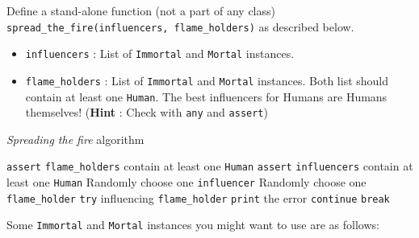 \documentclass[a4paper]{article}
\begin{document}
Define a stand-alone function (not a part of any class) \texttt{spread\_the\_fire(influencers, flame\_holders)} as described below.

\begin{itemize}
    \item \texttt{influencers} : List of \texttt{Immortal} and \texttt{Mortal} instances.
    \item \texttt{flame\_holders} : List of \texttt{Immortal} and \texttt{Mortal} instances. 
    Both list should contain at least one \texttt{Human}. The best influencers for Humans are Humans themselves! (\textbf{Hint} : Check with \texttt{any} and \texttt{assert})
\end{itemize}

\begin{algorithm}
    \caption{\textit{Spreading the fire} algorithm}
    \begin{algorithmic}[1]
            \State \texttt{assert} \texttt{flame\_holders} contain at least one \texttt{Human}
            \State \texttt{assert} \texttt{influencers} contain at least one \texttt{Human}
                \State Randomly choose one \texttt{influencer}
                \State Randomly choose one \texttt{flame\_holder}
                \State \texttt{try} influencing \texttt{flame\_holder}
                    \State \texttt{print} the error
                    \State \texttt{continue}
                \EndIf
                    \State \texttt{break}
                \EndIf
            \EndWhile
        \EndFunction
    \end{algorithmic}
\end{algorithm}

Some \texttt{Immortal} and \texttt{Mortal} instances you might want to use are as follows:
\end{document}
